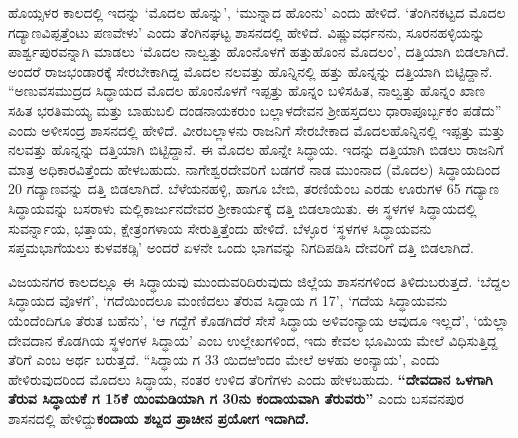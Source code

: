ಹೊಯ್ಸಳರ ಕಾಲದಲ್ಲಿ ಇದನ್ನು ‘ಮೊದಲ ಹೊನ್ನು’, ‘ಮುನ್ನಾದ ಹೊಂನು’ ಎಂದು ಹೇಳಿದೆ. ‘ತೆಂಗಿನಕಟ್ಟದ ಮೊದಲ ಗದ್ಯಾಣವಿಪ್ಪತ್ತೆಂಟು ಪಣವೇಳು’ ಎಂದು ತೆಂಗಿನಘಟ್ಟ ಶಾಸನದಲ್ಲಿ ಹೇಳಿದೆ. ವಿಷ್ಣುವರ್ಧನನು, ಸೂರನಹಳ್ಳಿಯನ್ನು ಪಾರ್ಶ್ವಪುರವನ್ನಾಗಿ ಮಾಡಲು ‘ಮೊದಲ ನಾಲ್ವತ್ತು ಹೊಂನೊಳಗೆ ಹತ್ತುಹೊಂನ ಮೊದಲಂ’, ದತ್ತಿಯಾಗಿ ಬಿಡಲಾಗಿದೆ. ಅಂದರೆ ರಾಜಭಂಡಾರಕ್ಕೆ ಸೇರಬೇಕಾಗಿದ್ದ ಮೊದಲ ನಲವತ್ತು ಹೊನ್ನಿನಲ್ಲಿ ಹತ್ತು ಹೊನ್ನನ್ನು ದತ್ತಿಯಾಗಿ ಬಿಟ್ಟಿದ್ದಾನೆ. “ಅಣುವಸಮುದ್ರದ ಸಿದ್ಧಾಯದ ಮೊದಲ ಹೊಂನೊಳಗೆ ಇಪ್ಪತ್ತು ಹೊನ್ನಂ ಬಳಿಸಹಿತ, ನಾಲ್ವತ್ತು ಹೊನ್ನಂ ಖಾಣ ಸಹಿತ ಭರತಿಮಯ್ಯ ಮತ್ತು ಬಾಹುಬಲಿ ದಂಡನಾಯಕರುಂ ಬಲ್ಲಾಳದೇವನ ಶ‍್ರೀಹಸ್ತದಲು ಧಾರಾಪೂರ್ಬ್ಬಕಂ ಪಡೆದು” ಎಂದು ಅಳೀಸಂದ್ರ ಶಾಸನದಲ್ಲಿ ಹೇಳಿದೆ. ವೀರಬಲ್ಲಾಳನು ರಾಜನಿಗೆ ಸೇರಬೇಕಾದ ಮೊದಲಹೊನ್ನಿನಲ್ಲಿ ಇಪ್ಪತ್ತು ಮತ್ತು ನಲವತ್ತು ಹೊನ್ನನ್ನು ದತ್ತಿಯಾಗಿ ಬಿಟ್ಟಿದ್ದಾನೆ. ಈ ಮೊದಲ ಹೊನ್ನೇ ಸಿದ್ಧಾಯ. ಇದನ್ನು ದತ್ತಿಯಾಗಿ ಬಿಡಲು ರಾಜನಿಗೆ ಮಾತ್ರ ಅಧಿಕಾರವಿತ್ತೆಂದು ಹೇಳಬಹುದು. ನಾಗೇಶ್ವರದೇವರಿಗೆ ಬಡಗರೆ ನಾಡ ಮುಂನಾದ (ಮೊದಲ) ಸಿದ್ಧಾಯದಿಂದ 20 ಗದ್ಯಾಣವನ್ನು ದತ್ತಿ ಬಿಡಲಾಗಿದೆ. ಬೆಳೆಯನಹಳ್ಳಿ, ಹಾಗೂ ಬೇಬಿ, ತರಣಿಯೆಂಬ ಎರಡು ಊರುಗಳ 65 ಗದ್ಯಾಣ ಸಿದ್ಧಾಯವನ್ನು ಬಸರಾಳು ಮಲ್ಲಿಕಾರ್ಜುನದೇವರ ಶ‍್ರೀಕಾರ್ಯಕ್ಕೆ ದತ್ತಿ ಬಿಡಲಾಯಿತು. ಈ ಸ್ಥಳಗಳ ಸಿದ್ಧಾಯದಲ್ಲಿ ಸುವರ್ನ್ನಾಯ, ಭತ್ತಾಯ, ಕ್ಷೇತ್ರಂಗಳಾಯ ಸೇರುತ್ತಿತ್ತೆಂದು ಹೇಳಿದೆ. ಬೆಳ್ಳೂರ ‘ಸ್ಥಳಗಳ ಸಿದ್ಧಾಯವನು ಸಪ್ತಮಭಾಗೆಯಲು ಕುಳವಕಡ್ಸಿ’ ಅಂದರೆ ಏಳನೇ ಒಂದು ಭಾಗವನ್ನು ನಿಗದಿಪಡಿಸಿ ದೇವರಿಗೆ ದತ್ತಿ ಬಿಡಲಾಗಿದೆ.

ವಿಜಯನಗರ ಕಾಲದಲ್ಲೂ ಈ ಸಿದ್ಧಾಯವು ಮುಂದುವರಿದಿರುವುದು ಜಿಲ್ಲೆಯ ಶಾಸನಗಳಿಂದ ತಿಳಿದುಬರುತ್ತದೆ. ‘ಬೆದ್ದಲ ಸಿದ್ಧಾಯದ ವೊಳಗೆ’, ‘ಗದೆಯಿಂದಲೂ ಮಂಣಿದಲು ತೆರುವ ಸಿದ್ಧಾಯ ಗ 17’, ‘ಗದೆಯ ಸಿದ್ಧಾಯವನು ಯೆಂದೆಂದಿಗೂ ತೆರುತ ಬಹೆನು’, ‘ಆ ಗದ್ದೆಗೆ ಕೊಡಗಿದೆರೆ ಸೇಸೆ ಸಿದ್ಧಾಯ ಅಳಿವಂನ್ಯಾಯ ಆವುದೂ ಇಲ್ಲದೆ’, ‘ಯೆಲ್ಲಾ ದೇವದಾನ ಕೊಡಗಿಯ ಸ್ಥಳಂಗಳ ಸಿದ್ಧಾಯ’ ಎಂಬ ಉಲ್ಲೇಖಗಳಿಂದ, ಇದು ಕೇವಲ ಭೂಮಿಯ ಮೇಲೆ ವಿಧಿಸುತ್ತಿದ್ದ ತೆರಿಗೆ ಎಂಬ ಅರ್ಥ ಬರುತ್ತದೆ. “ಸಿದ್ಧಾಯ ಗ 33 ಯಿದಱಿಂದಂ ಮೇಲೆ ಅಳಹು ಅಂನ್ಯಾಯ’, ಎಂದು ಹೇಳಿರುವುದರಿಂದ ಮೊದಲು ಸಿದ್ಧಾಯ, ನಂತರ ಉಳಿದ ತೆರಿಗೆಗಳು ಎಂದು ಹೇಳಬಹುದು. \textbf{“ದೇವದಾನ ಒಳಗಾಗಿ ತೆರುವ ಸಿದ್ಧಾಯಕೆ ಗ 15ಕೆ ಯಿಂಮಡಿಯಾಗಿ ಗ 30ನು ಕಂದಾಯವಾಗಿ ತೆರುವರು”} ಎಂದು ಬಸವನಪುರ ಶಾಸನದಲ್ಲಿ ಹೇಳಿದ್ದು\textbf{ಕಂದಾಯ ಶಬ್ದದ ಪ್ರಾಚೀನ ಪ್ರಯೋಗ ಇದಾಗಿದೆ.}

